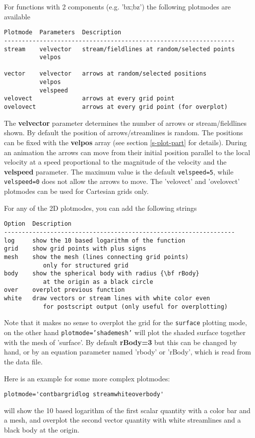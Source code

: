    For functions with 2 components (e.g. 'bx;bz') the following plotmodes
   are available
\begin{verbatim}
Plotmode  Parameters  Description
-----------------------------------------------------------------
stream    velvector   stream/fieldlines at random/selected points
          velpos      

vector    velvector   arrows at random/selected positions
          velpos
          velspeed
velovect              arrows at every grid point
ovelovect             arrows at every grid point (for overplot)
\end{verbatim}
   The {\bf velvector} parameter determines the number of arrows or
   stream/fieldlines shown. By default the position of arrows/streamlines
   is random. The positions can be fixed with the {\bf velpos} array
   (see section \ref{s-plot-part} for details). 
   During an animation the arrows can move from their initial position
   parallel to the local velocity at a speed proportional to the magnitude
   of the velocity and the {\bf velspeed} parameter. The maximum value
   is the default {\tt velspeed=5}, while {\tt velspeed=0} does not allow
   the arrows to move. 
   The 'velovect' and 'ovelovect' plotmodes 
   can be used for Cartesian grids only.

   For any of the 2D plotmodes, you can add the following strings
\begin{verbatim}
Option  Description
-----------------------------------------------------------------
log     show the 10 based logarithm of the function
grid    show grid points with plus signs
mesh    show the mesh (lines connecting grid points) 
           only for structured grid
body    show the spherical body with radius {\bf rBody} 
           at the origin as a black circle
over    overplot previous function
white   draw vectors or stream lines with white color even 
           for postscript output (only useful for overplotting)
\end{verbatim}
   Note that it makes no sense to overplot the grid for the 
   {\tt surface} plotting mode, on the other hand {\tt plotmode='shademesh'}
   will plot the shaded surface together with the mesh of 'surface'.
   By default {\bf rBody=3} but this can be changed by hand, or by an equation
   parameter named 'rbody' or 'rBody', which is read from the data file.

   Here is an example for some more complex plotmodes:
\begin{verbatim}
plotmode='contbargridlog streamwhiteoverbody'
\end{verbatim} 
   will show the 10 based logarithm of the first scalar quantity with a color bar 
   and a mesh, and overplot the second vector quantity with white streamlines
   and a black body at the origin.

